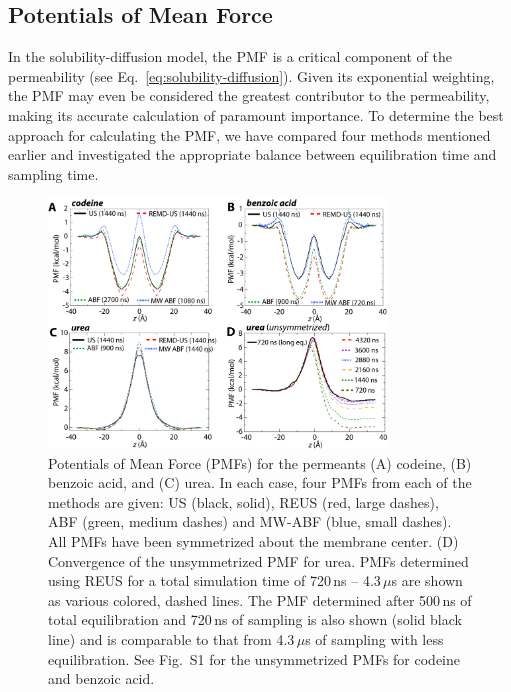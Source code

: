 
\subsection*{Potentials of Mean Force}
  \par In the solubility-diffusion model, the PMF is a critical component of the permeability (see Eq.~\ref{eq:solubility-diffusion}).  Given its exponential weighting, the PMF may even be considered the greatest contributor to the permeability, making its accurate calculation of paramount importance.  To determine the best approach for calculating the PMF, we have compared four methods mentioned earlier and investigated the appropriate balance between equilibration time and sampling time.

\begin{figure}[htbp]
\begin{center}
	\includegraphics[width=0.8\textwidth]{Figures/PMFs-all}
	\caption{Potentials of Mean Force (PMFs) for the permeants (A) codeine, (B) benzoic acid, and (C) urea.  In each case, four PMFs from each of the methods are given: US (black, solid), REUS (red, large dashes), ABF (green, medium dashes) and MW-ABF (blue, small dashes).  All PMFs have been symmetrized about the membrane center.  (D) Convergence of the unsymmetrized PMF for urea.  PMFs determined using REUS for a total simulation time of 720\,ns -- 4.3\,$\mu$s are shown as various colored, dashed lines.  The PMF determined after 500\,ns of total equilibration and 720\,ns of sampling is also shown (solid black line) and is comparable to that from 4.3\,$\mu$s of sampling with less equilibration. See Fig.~S1 for the unsymmetrized PMFs for codeine and benzoic acid.}
	\label{fig:PMFs}
\end{center}
\end{figure}

